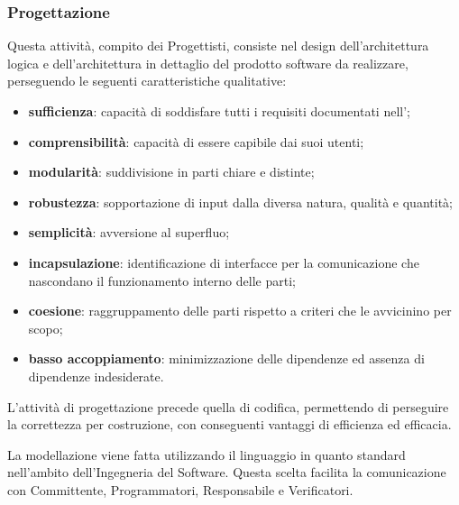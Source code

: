 \newpage

    \subsubsection{Progettazione} \label{progettazione}
		Questa attività, compito dei Progettisti, consiste nel design dell'architettura logica e dell'architettura in dettaglio del prodotto software da realizzare, perseguendo le seguenti caratteristiche qualitative:
			\begin{itemize}
				\item \textbf{sufficienza}: capacità di soddisfare tutti i requisiti documentati nell'\vAnalisiDeiRequisiti{};
				\item \textbf{comprensibilità}: capacità di essere capibile dai suoi utenti;
				\item \textbf{modularità}: suddivisione in parti chiare e distinte;
				\item \textbf{robustezza}: sopportazione di input dalla diversa natura, qualità e quantità;
				\item \textbf{semplicità}: avversione al superfluo;
				\item \textbf{incapsulazione}: identificazione di interfacce per la comunicazione che nascondano il funzionamento interno delle parti;
				\item \textbf{coesione}: raggruppamento delle parti rispetto a criteri che le avvicinino per scopo;
				\item \textbf{basso accoppiamento}: minimizzazione delle dipendenze ed assenza di dipendenze indesiderate.
			\end{itemize}

		L'attività di progettazione precede quella di codifica, permettendo di perseguire la correttezza per costruzione, con conseguenti vantaggi di efficienza ed efficacia.

		 \label{tecnica_progettazione}

			La modellazione viene fatta utilizzando il linguaggio  in quanto standard nell'ambito dell'Ingegneria del Software. Questa scelta facilita la comunicazione con Committente, Programmatori, Responsabile e Verificatori.

